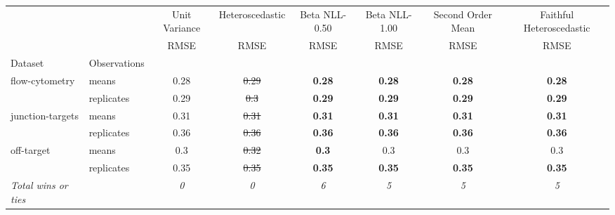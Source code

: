 \begin{tabular}{ll|c|c|c|c|c|c}
\toprule
{} & {} & {Unit Variance} & {Heteroscedastic} & {Beta NLL-0.50} & {Beta NLL-1.00} & {Second Order Mean} & {Faithful Heteroscedastic} \\
{} & {} & {RMSE} & {RMSE} & {RMSE} & {RMSE} & {RMSE} & {RMSE} \\
{Dataset} & {Observations} & {} & {} & {} & {} & {} & {} \\
\midrule
\multirow[t]{2}{*}{flow-cytometry} & means & 0.28 & \sout{0.29} & \textbf{0.28} & \textbf{0.28} & \textbf{0.28} & \textbf{0.28} \\
 & replicates & 0.29 & \sout{0.3} & \textbf{0.29} & \textbf{0.29} & \textbf{0.29} & \textbf{0.29} \\
\multirow[t]{2}{*}{junction-targets} & means & 0.31 & \sout{0.31} & \textbf{0.31} & \textbf{0.31} & \textbf{0.31} & \textbf{0.31} \\
 & replicates & 0.36 & \sout{0.36} & \textbf{0.36} & \textbf{0.36} & \textbf{0.36} & \textbf{0.36} \\
\multirow[t]{2}{*}{off-target} & means & 0.3 & \sout{0.32} & \textbf{0.3} & 0.3 & 0.3 & 0.3 \\
 & replicates & 0.35 & \sout{0.35} & \textbf{0.35} & \textbf{0.35} & \textbf{0.35} & \textbf{0.35} \\
\textit{{Total wins or ties}} &  & \textit{0} & \textit{0} & \textit{6} & \textit{5} & \textit{5} & \textit{5} \\
\bottomrule
\end{tabular}
